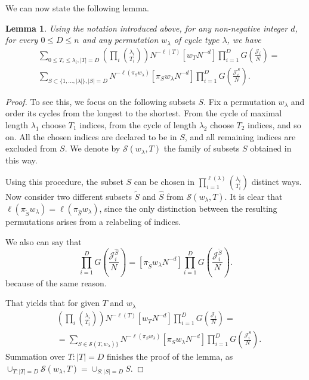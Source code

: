 \documentclass{article}
\theoremstyle{plain}
\newtheorem{lemma}[thm]{Lemma}
\theoremstyle{definition}
\numberwithin{equation}{section}
\begin{document}
We can now state the following lemma.
\begin{lemma}
    \label{lem:piS}
    Using the notation introduced above, for any non-negative integer $d$, for every $0 \le D \le n$ and any permutation $w_\lambda$ of cycle type $\lambda$, we have
    \begin{equation}
        \begin{aligned}
            & \sum_{0 \le T_{i} \le \lambda_{i}, |T| = D} \left(\prod_{i} \binom{\lambda_{i}}{T_{i}} \right)  N^{- \ell(T)} [w_{T} N^{-d}] \prod_{i=1}^{D} G\left(\frac{\mathcal{J}_{i}}{N} \right) = \\
            & \sum_{S \subset \{1,...,|\lambda|\}, |S| = D}  N^{- \ell(\pi_S w_\lambda)} [\pi_S w_\lambda N^{-d}] \prod_{i=1}^{D} G\left(\frac{\mathcal{J}_{i}^S}{N} \right).
        \end{aligned}
    \end{equation}
\end{lemma}
\begin{proof}
    To see this, we focus on the following subsets $S$. Fix a permutation $w_\lambda$ and order its cycles from the longest to the shortest. From the cycle of maximal length $\lambda_1$ choose $T_1$ indices, from the cycle of length $\lambda_2$ choose $T_2$ indices, and so on. All the chosen indices are declared to be in $S$, and all remaining indices are excluded from $S$. We denote by $\mathcal{S}(w_\lambda, T)$ the family of subsets $S$ obtained in this way.

    Using this procedure, the subset $S$ can be chosen in $\prod_{i=1}^{\ell(\lambda)} \binom{\lambda_i}{T_i}$ distinct ways. Now consider two different subsets $\tilde S$ and $\hat S$ from $\mathcal{S}(w_\lambda, T)$. It is clear that $\ell(\pi_{\tilde S} w_\lambda) = \ell(\pi_{\hat{S}} w_\lambda)$, since the only distinction between the resulting permutations arises from a relabeling of indices.

    We also can say that
    \begin{equation}
        [\pi_{\hat S} w_\lambda N^{-d}] \prod_{i=1}^{D} G\left(\frac{\mathcal{J}_{i}^{\hat S}}{N} \right) = [\pi_{\tilde S} w_\lambda N^{-d}] \prod_{i=1}^{D} G\left(\frac{\mathcal{J}_{i}^{\tilde S}}{N} \right).
    \end{equation}
    because of the same reason.

    That yields that for given $T$ and $w_\lambda$
    \begin{equation}
        \begin{aligned}
            & \left(\prod_{i} \binom{\lambda_{i}}{T_{i}} \right)  N^{- \ell(T)} [w_{T} N^{-d}] \prod_{i=1}^{D} G\left(\frac{\mathcal{J}_{i}}{N} \right) = \\
            & = \sum_{S \in \mathcal{S}(T,w_\lambda)\}}  N^{- \ell(\pi_S w_\lambda)} [\pi_S w_\lambda N^{-d}] \prod_{i=1}^{D} G\left(\frac{\mathcal{J}_{i}^S}{N} \right).
        \end{aligned}
    \end{equation}
    Summation over $T: |T| = D$ finishes the proof of the lemma, as $\cup_{T:|T|=D} \mathcal{S}(w_\lambda, T) = \cup_{S:|S|=D}S$.
    
\end{proof}
\end{document}
